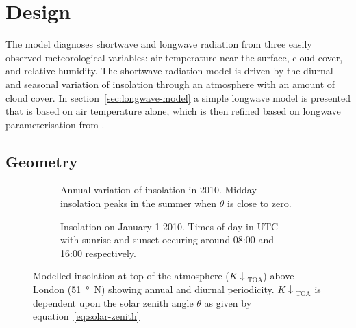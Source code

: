 \documentclass[a4paper,titlepage, twoside]{report}
\newcommand\Kdowntoa{{K\!\!\downarrow}_\mathrm{TOA}}
\begin{document}
\section{Design}
The model diagnoses shortwave and longwave radiation from three easily observed meteorological variables: air temperature near the surface, cloud cover, and relative humidity.  The shortwave radiation model is driven by the diurnal and seasonal variation of insolation through an atmosphere with an amount of cloud cover.  In section~\ref{sec:longwave-model} a simple longwave model is presented that is based on air temperature alone, which is then refined based on longwave parameterisation from \cite{loridan}.

\subsection{Geometry}
\begin{figure}
\centering
\begin{subfigure}{0.52\textwidth}
\hspace{-1em}

\caption{Annual variation of insolation in 2010.  Midday insolation peaks in the summer when $\theta$ is close to zero.}
\end{subfigure}
\hfill
\begin{subfigure}{0.4\textwidth}
\hspace{-2.2em}

\caption{Insolation on January 1 2010.  Times of day in UTC with sunrise and sunset occuring around 08:00 and 16:00 respectively.}
\end{subfigure}
\caption{Modelled insolation at top of the atmosphere ($\Kdowntoa$) above London (\SI{51}{\degree N}) showing annual and diurnal periodicity.  $\Kdowntoa$ is dependent upon the solar zenith angle $\theta$ as given by equation~\ref{eq:solar-zenith}}
\label{fig:toa-model}
\end{figure}
\end{document}
